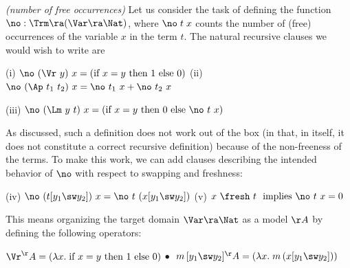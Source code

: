 \begin{exa}\rm 
	\textit{(number of free occurrences)} 
%
Let us consider the task of defining the function $\no : \Trm \ra (\Var \ra \Nat)$, where 
$\no\;t\;x$ counts the number of (free) occurrences of the variable $x$ in the term $t$. 
%
The natural recursive clauses we would wish to write are 
\begin{myitem}
	\item[(i)]
	$\no\ (\Vr\ y)\ x= \mbox{(if $x = y$ then $1$ else 0)}$
\hspace*{3ex} (ii) 
	$\no\ (\Ap\ t_1\ t_2)\ x= \no\ t_1\ x + \no\ t_2\ x$ 
	\item[(iii)]
	$	\no\ (\Lm\ y\ t)\ x = 
	\mbox{(if $x = y$ then $0$ else $\no\ t\ x$)}$
\end{myitem}
%
As discussed, %
such a definition does not work out of the box (in that, in itself, it does not constitute a correct recursive definition) because of the non-freeness of the terms. %
%
To make this work, we can add clauses describing the intended behavior of $\no$ with respect to swapping and freshness: 
% 
\begin{myitem}
	\item[(iv)] $\no\ (t[y_1 \sw y_2])\ x = \no\ t \ (x[y_1 \sw y_2])$
	\hspace*{8ex} (v)
	$x\ \fresh\ t\ \mbox{ \rm implies } \no\ t\ x = 0$
	
\end{myitem}
%
This means %
organizing the target domain 
%
$\Var \ra \Nat$ as a model $\AA$ 
by defining %
the following 
operators: 
\begin{myitem} 
	\item $\Vr^\AA = (\lambda x.\; \mbox{if $x = y$ then $1$ else 0})$
	\hspace*{7.3ex}
	$\bullet\;$ $m\,[y_1\sw y_2]^\AA = (\lambda x.\; m\,(x[y_1 \sw y_2]))$
	

\end{myitem}
\end{exa}
